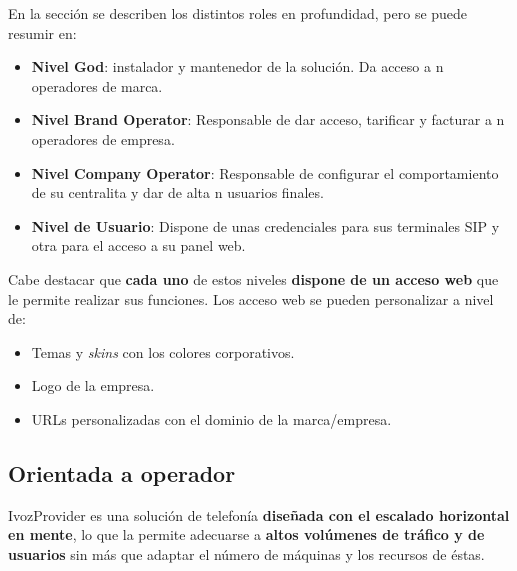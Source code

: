 \documentclass[letterpaper,10pt,spanish]{sphinxmanual}
\begin{document}
\noindent{}

En la sección {\hyperref[operation_roles/index:operation\string-roles]{}} se describen los distintos roles en profundidad, pero se puede resumir en:
\begin{itemize}
\item {} 
\textbf{Nivel God}: instalador y mantenedor de la solución. Da acceso a n operadores de marca.

\item {} 
\textbf{Nivel Brand Operator}: Responsable de dar acceso, tarificar y facturar a n operadores de empresa.

\item {} 
\textbf{Nivel Company Operator}: Responsable de configurar el comportamiento de su centralita y dar de alta n usuarios finales.

\item {} 
\textbf{Nivel de Usuario}: Dispone de unas credenciales para sus terminales SIP y otra para el acceso a su panel web.

\end{itemize}

Cabe destacar que \textbf{cada uno} de estos niveles \textbf{dispone de un acceso web} que le permite realizar sus funciones. Los acceso web se pueden personalizar a nivel de:
\begin{itemize}
\item {} 
Temas y \emph{skins} con los colores corporativos.

\item {} 
Logo de la empresa.

\item {} 
URLs personalizadas con el dominio de la marca/empresa.

\end{itemize}


\subsection{Orientada a operador}
\label{intro/what_is_ivozprovider:operator-oriented}\label{intro/what_is_ivozprovider:provider-oriented}
IvozProvider es una solución de telefonía \textbf{diseñada con el escalado horizontal en mente}, lo que la permite adecuarse a \textbf{altos volúmenes de tráfico y de usuarios} sin más que adaptar el número de máquinas y los recursos de éstas.
\end{document}
